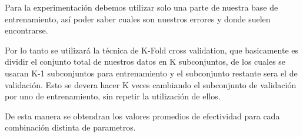 Para la experimentación debemos utilizar solo una parte de nuestra base de entrenamiento, así poder saber cuales son nuestros errores y donde suelen encontrarse.

Por lo tanto se utilizará la técnica de K-Fold cross validation, que basicamente es dividir el conjunto total de nuestros datos en K subconjuntos, de los cuales se usaran K-1 subconjuntos para entrenamiento y el subconjunto restante sera el de validación. Esto se devera hacer K veces cambiando el subconjunto de validación por uno de entrenamiento, sin repetir la utilización de ellos.

De esta manera se obtendran los valores promedios de efectividad para cada combinación distinta de parametros.